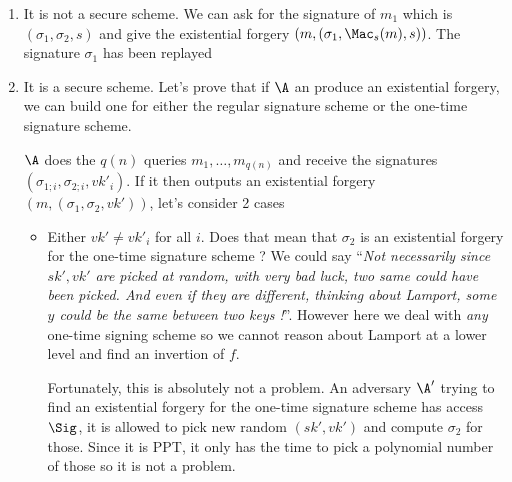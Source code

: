 \begin{solution}
	\begin{enumerate}
		\item
		It is not a secure scheme.
		We can ask for the signature of $m_1$ which is $(\sigma_1, \sigma_2, s)$ and give the existential forgery
		$(m, (\sigma_1, \Mac_s(m), s))$.
		The signature $\sigma_1$ has been replayed
		\item
		It is a secure scheme.
		Let's prove that if $\A$ an produce an existential forgery,
		we can build one for either the regular signature scheme or the one-time signature scheme.
		
		$\A$ does the $q(n)$ queries $m_1, \ldots, m_{q(n)}$ and receive the signatures $(\sigma_{1;i}, \sigma_{2;i}, {vk'}_i)$.
		If it then outputs an existential forgery $(m, (\sigma_1, \sigma_2, vk'))$, let's consider 2 cases
		\begin{itemize}
			\item
			Either $vk' \neq {vk'}_i$ for all $i$.
			Does that mean that $\sigma_2$ is an existential forgery for the one-time signature scheme ?
			We could say ``\emph{Not necessarily since $sk',vk'$ are picked at random, with very bad luck, two same could have been picked.
				And even if they are different, thinking about Lamport, some $y$ could be the same between two keys !}''.
			However here we deal with \emph{any} one-time signing scheme so we cannot reason about Lamport at a lower level and find an invertion of $f$.
			
			Fortunately, this is absolutely not a problem.
			An adversary $\A'$ trying to find an existential forgery for the one-time signature scheme has access $\Sig$,
			it is allowed to pick new random $(sk', vk')$ and compute $\sigma_2$ for those.
			Since it is PPT, it only has the time to pick a polynomial number of those so it is not a problem.
			

\end{itemize}
\end{enumerate}
\end{solution}
